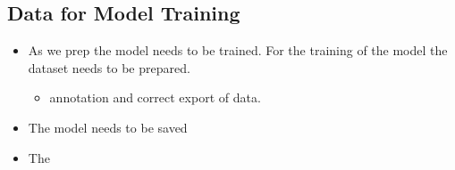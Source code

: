 \subsection{Data for Model Training}
\begin{itemize}
	\item As we prep the model needs to be trained. For the training of the model the dataset needs to be prepared.
	      \begin{itemize}
		      \item annotation and correct export of data.
	      \end{itemize}
	\item The model needs to be saved
	\item The
\end{itemize}
